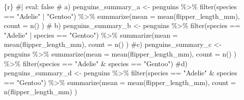 \documentclass[
  letterpaper,
  DIV=11,
  numbers=noendperiod]{scrreprt}
\newenvironment{Shaded}{\begin{snugshade}}{\end{snugshade}}
\newcommand{\AttributeTok}[1]{\textcolor[rgb]{0.40,0.45,0.13}{#1}}
\newcommand{\CommentTok}[1]{\textcolor[rgb]{0.37,0.37,0.37}{#1}}
\newcommand{\FunctionTok}[1]{\textcolor[rgb]{0.28,0.35,0.67}{#1}}
\newcommand{\InformationTok}[1]{\textcolor[rgb]{0.37,0.37,0.37}{#1}}
\newcommand{\NormalTok}[1]{\textcolor[rgb]{0.00,0.23,0.31}{#1}}
\newcommand{\OtherTok}[1]{\textcolor[rgb]{0.00,0.23,0.31}{#1}}
\newcommand{\SpecialCharTok}[1]{\textcolor[rgb]{0.37,0.37,0.37}{#1}}
\newcommand{\StringTok}[1]{\textcolor[rgb]{0.13,0.47,0.30}{#1}}
\begin{document}
\begin{tcolorbox}[enhanced jigsaw, colframe=quarto-callout-note-color-frame, breakable, colback=white, toprule=.15mm, leftrule=.75mm, left=2mm, opacityback=0, rightrule=.15mm, arc=.35mm, bottomrule=.15mm]
\begin{Shaded}
\begin{Highlighting}[]
\InformationTok{\textasciigrave{}\textasciigrave{}\textasciigrave{}\{r\}}
\CommentTok{\#| eval: false}
\CommentTok{\# a)}
\NormalTok{penguins\_summary\_a }\OtherTok{\textless{}{-}}\NormalTok{ penguins }\SpecialCharTok{\%\textgreater{}\%} 
  \FunctionTok{filter}\NormalTok{(species }\SpecialCharTok{==} \StringTok{"Adelie"} \SpecialCharTok{|} \StringTok{"Gentoo"}\NormalTok{) }\SpecialCharTok{\%\textgreater{}\%} 
  \FunctionTok{summarize}\NormalTok{(}\AttributeTok{mean =} \FunctionTok{mean}\NormalTok{(flipper\_length\_mm),}
            \AttributeTok{count =} \FunctionTok{n}\NormalTok{() )}
\CommentTok{\# b)}
\NormalTok{penguins\_summary\_b }\OtherTok{\textless{}{-}}\NormalTok{ penguins }\SpecialCharTok{\%\textgreater{}\%} 
  \FunctionTok{filter}\NormalTok{(species }\SpecialCharTok{==} \StringTok{"Adelie"} \SpecialCharTok{|}\NormalTok{ species }\SpecialCharTok{==} \StringTok{"Gentoo"}\NormalTok{) }\SpecialCharTok{\%\textgreater{}\%} 
  \FunctionTok{summarize}\NormalTok{(}\AttributeTok{mean =} \FunctionTok{mean}\NormalTok{(flipper\_length\_mm),}
            \AttributeTok{count =} \FunctionTok{n}\NormalTok{() )}
\CommentTok{\#c)}
\NormalTok{penguins\_summary\_c }\OtherTok{\textless{}{-}}\NormalTok{ penguins }\SpecialCharTok{\%\textgreater{}\%} 
  \FunctionTok{summarize}\NormalTok{(}\AttributeTok{mean =} \FunctionTok{mean}\NormalTok{(flipper\_length\_mm),}
            \AttributeTok{count =} \FunctionTok{n}\NormalTok{() ) }\SpecialCharTok{\%\textgreater{}\%} 
  \FunctionTok{filter}\NormalTok{(species }\SpecialCharTok{==} \StringTok{"Adelie"} \SpecialCharTok{\&}\NormalTok{ species }\SpecialCharTok{==} \StringTok{"Gentoo"}\NormalTok{)}
\CommentTok{\#d)}
\NormalTok{penguins\_summary\_d }\OtherTok{\textless{}{-}}\NormalTok{ penguins }\SpecialCharTok{\%\textgreater{}\%} 
  \FunctionTok{filter}\NormalTok{(species }\SpecialCharTok{==} \StringTok{"Adelie"} \SpecialCharTok{\&}\NormalTok{ species }\SpecialCharTok{==} \StringTok{"Gentoo"}\NormalTok{) }\SpecialCharTok{\%\textgreater{}\%} 
  \FunctionTok{summarize}\NormalTok{(}\AttributeTok{mean =} \FunctionTok{mean}\NormalTok{(flipper\_length\_mm),}
            \AttributeTok{count =} \FunctionTok{n}\NormalTok{(flipper\_length\_mm) )}
\InformationTok{\textasciigrave{}\textasciigrave{}\textasciigrave{}}
\end{Highlighting}
\end{Shaded}

\end{tcolorbox}
\end{document}
